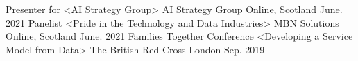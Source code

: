 

\begin{cventries}

  \cventry
    {Presenter for <AI Strategy Group>} %
    {AI Strategy Group} %
    {Online, Scotland} %
    {June. 2021} %
    {}
\vspace{-10pt}
  \cventry
    {Panelist <Pride in the Technology and Data Industries>} %
    {MBN Solutions} %
    {Online, Scotland} %
    {June. 2021} %
    {}
\vspace{-10pt}
  \cventry
    {Families Together Conference <Developing a Service Model from Data> } %
    {The British Red Cross} %
    {London} %
    {Sep. 2019} %
    {}

\end{cventries}
